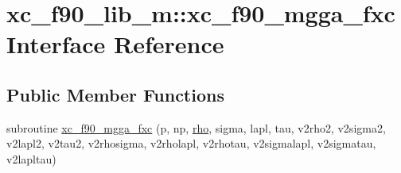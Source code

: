 \hypertarget{interfacexc__f90__lib__m_1_1xc__f90__mgga__fxc}{\section{xc\-\_\-f90\-\_\-lib\-\_\-m\-:\-:xc\-\_\-f90\-\_\-mgga\-\_\-fxc Interface Reference}
\label{interfacexc__f90__lib__m_1_1xc__f90__mgga__fxc}
}
\subsection*{Public Member Functions}
\begin{DoxyCompactItemize}
\item 
subroutine \hyperlink{interfacexc__f90__lib__m_1_1xc__f90__mgga__fxc_ac180f8d6c0c084db2584e4c1fcd21f50}{xc\-\_\-f90\-\_\-mgga\-\_\-fxc} (p, np, \hyperlink{md_8h_a52b35cee8a5db846ce98f4904e1c8b13}{rho}, sigma, lapl, tau, v2rho2, v2sigma2, v2lapl2, v2tau2, v2rhosigma, v2rholapl, v2rhotau, v2sigmalapl, v2sigmatau, v2lapltau)
\end{DoxyCompactItemize}


